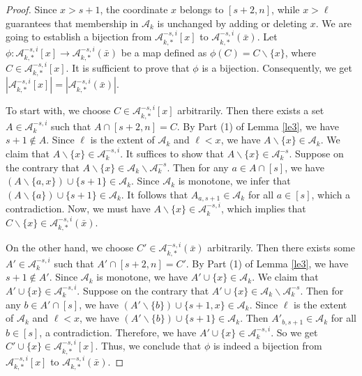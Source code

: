 \documentclass[11pt,a4paper]{article}
\begin{document}
\begin{proof}
Since $x>s+1$, the coordinate $x$ belongs to $[s+2,n]$, while
$x>\ell$ guarantees that membership in $\mathcal A_k$ is unchanged
by adding or deleting $x$.
We are going to establish a bijection from $ \mathcal{A}_{k,*}^{-s,i}[x]$ to 
$\mathcal{A}_{k,*}^{-s,i}(\bar{x})$.
Let $\phi: \mathcal{A}_{k,*}^{-s,i}[x] \longrightarrow\mathcal{A}_{k,*}^{-s,i}(\bar{x})$ be a map defined as $\phi(C)=C\backslash\{x\}$, where $C\in \mathcal{A}_{k,*}^{-s,i}[x]$. 
It is sufficient to prove that $\phi$ is a bijection.  Consequently, we get $|\mathcal{A}_{k,*}^{-s,i}[x]|=|\mathcal{A}_{k,*}^{-s,i}(\bar{x})|$. 

To start with, we choose $C\in \mathcal{A}_{k,*}^{-s,i}[x]$  arbitrarily. Then there exists a set $A\in \mathcal{A}_k^{-s,i}$ such that $A\cap [s+2, n]=C$.
By Part (1) of Lemma \ref{le3}, we have $s+1\notin A$.
Since $\ell$ is the extent of  $\mathcal{A}_k$ and $\ell<x$, we have $A\backslash\{x\}\in \mathcal{A}_k$. We claim that $A\backslash\{x\}\in \mathcal{A}_k^{-s, i}$. It suffices to show that $A\backslash\{x\}\in \mathcal{A}_k^{-s}$.
Suppose on the contrary that $A\backslash\{x\}\in \mathcal{A}_k\backslash\mathcal{A}_k^{-s}$. Then for any $a\in A\cap [s]$, we have 
$(A\backslash\{a, x\})\cup\{s+1\} \in \mathcal{A}_k$. Since $\mathcal{A}_k$ is monotone, we infer that $(A\backslash\{a\})\cup\{s+1\}\in \mathcal{A}_k$. It follows that
$A_{a,s+1} \in \mathcal{A}_k$ for all $a\in [s]$, which a contradiction.
Now, we must have $A\backslash\{x\}\in \mathcal{A}_k^{-s, i}$, which implies that $C\backslash\{x\}\in \mathcal{A}_{k,*}^{-s, i}(\bar{x})$.

On the other hand, we choose $C'\in \mathcal{A}_{k,*}^{-s,i}(\bar{x})$  arbitrarily.
Then there exists some $A'\in \mathcal{A}_k^{-s,i}$ such that $A'\cap [s+2, n]=C'$. By Part (1) of Lemma \ref{le3}, we have $s+1\notin A'$. Since $\mathcal{A}_k$ is monotone, we have $A'\cup\{x\}\in \mathcal{A}_k$. We claim that $A'\cup\{x\}\in \mathcal{A}_k^{-s, i}$.
Suppose on the contrary that $A'\cup\{x\}\in \mathcal{A}_k\backslash\mathcal{A}_k^{-s}$. Then for any $b\in A'\cap [s]$, we have 
$(A'\backslash\{b\})\cup\{s+1,x\} \in \mathcal{A}_k$.
Since $\ell$ is the extent of  $\mathcal{A}_k$ and  $\ell<x$, we have $(A'\backslash\{b\})\cup\{s+1\} \in \mathcal{A}_k$.
Then
$A'_{b,s+1} \in \mathcal{A}_k$ for all $b\in [s]$, a contradiction.
Therefore, we have $A'\cup\{x\}\in \mathcal{A}_k^{-s, i}$. So we get 
$C'\cup\{x\}\in \mathcal{A}_{k,*}^{-s, i}[x]$. 
Thus, we conclude that $\phi$ is indeed a bijection from $ \mathcal{A}_{k,*}^{-s,i}[x]$ to 
$\mathcal{A}_{k,*}^{-s,i}(\bar{x})$.
\end{proof}
\end{document}
